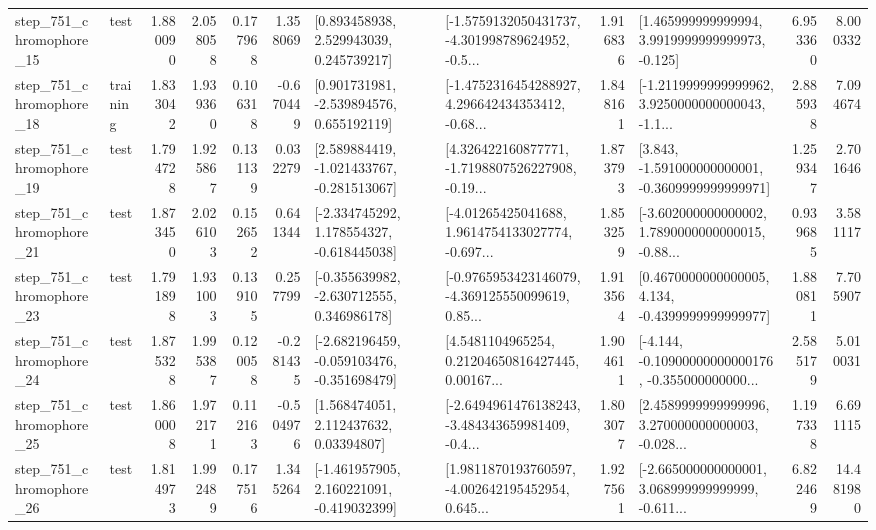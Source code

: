 \begin{tabular}{llrrrrllrlrr}
  step\_751\_chromophore\_15 &      test &      1.880090 &    2.058058 &      0.177968 &  1.358069 &     [0.893458938, 2.529943039, 0.245739217] &  [-1.5759132050431737, -4.301998789624952, -0.5... &       1.916836 &    [1.465999999999994, 3.9919999999999973, -0.125] &            6.953360 &          8.000332 \\
  step\_751\_chromophore\_18 &  training &      1.833042 &    1.939360 &      0.106318 & -0.670449 &    [0.901731981, -2.539894576, 0.655192119] &  [-1.4752316454288927, 4.296642434353412, -0.68... &       1.848161 &  [-1.2119999999999962, 3.9250000000000043, -1.1... &            2.885938 &          7.094674 \\
  step\_751\_chromophore\_19 &      test &      1.794728 &    1.925867 &      0.131139 &  0.032279 &   [2.589884419, -1.021433767, -0.281513067] &  [4.326422160877771, -1.7198807526227908, -0.19... &       1.873793 &   [3.843, -1.591000000000001, -0.3609999999999971] &            1.259347 &          2.701646 \\
  step\_751\_chromophore\_21 &      test &      1.873450 &    2.026103 &      0.152652 &  0.641344 &   [-2.334745292, 1.178554327, -0.618445038] &  [-4.01265425041688, 1.9614754133027774, -0.697... &       1.853259 &  [-3.602000000000002, 1.7890000000000015, -0.88... &            0.939685 &          3.581117 \\
  step\_751\_chromophore\_23 &      test &      1.791898 &    1.931003 &      0.139105 &  0.257799 &   [-0.355639982, -2.630712555, 0.346986178] &  [-0.9765953423146079, -4.369125550099619, 0.85... &       1.913564 &   [0.4670000000000005, 4.134, -0.4399999999999977] &            1.880811 &          7.705907 \\
  step\_751\_chromophore\_24 &      test &      1.875328 &    1.995387 &      0.120058 & -0.281435 &  [-2.682196459, -0.059103476, -0.351698479] &  [4.5481104965254, 0.21204650816427445, 0.00167... &       1.904611 &  [-4.144, -0.10900000000000176, -0.355000000000... &            2.585179 &          5.010031 \\
  step\_751\_chromophore\_25 &      test &      1.860008 &    1.972171 &      0.112163 & -0.504976 &      [1.568474051, 2.112437632, 0.03394807] &  [-2.6494961476138243, -3.484343659981409, -0.4... &       1.803077 &  [2.4589999999999996, 3.270000000000003, -0.028... &            1.197338 &          6.691115 \\
  step\_751\_chromophore\_26 &      test &      1.814973 &    1.992489 &      0.177516 &  1.345264 &   [-1.461957905, 2.160221091, -0.419032399] &  [1.9811870193760597, -4.002642195452954, 0.645... &       1.927561 &  [-2.665000000000001, 3.068999999999999, -0.611... &            6.822469 &         14.481980 \\

\end{tabular}
